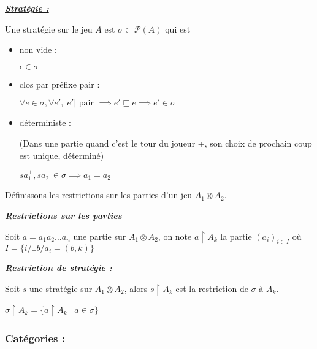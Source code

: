 \documentclass[a4paper,12ptCOUCOU
]{article}
\newlength{\mydepth}
\newlength{\myheight}
\newenvironment{answer}[1]
{\vspace{0.5cm}\begin{minipage}{\linewidth}\textbf{\textit{\underline{#1}}}\par\begin{lrbox}{\mybox}\quad\begin{minipage}{\linewidth}\color{black}\setlength{\parskip}{10pt}}
{\end{minipage}\end{lrbox}
\settodepth{\mydepth}{\usebox{\mybox}}
\settoheight{\myheight}{\usebox{\mybox}}
\addtolength{\myheight}{\mydepth}
\noindent\makebox[0pt]{
  \color{gray}\hspace{-0pt}\rule[-\mydepth]{1pt}{\myheight}}
\usebox{\mybox}
\end{minipage}
  }
\begin{document}
\begin{answer}{Stratégie :}
Une stratégie sur le jeu $A$ est $\sigma \subset \mathcal{P}(A)$ qui est
\begin{itemize}
\item non vide :

$\epsilon \in \sigma$

\item clos par préfixe pair :

$\forall e \in \sigma, \forall e', |e'| \text{ pair } \implies e' \sqsubseteq e \implies e' \in \sigma$

\item déterministe :

(Dans une partie quand c'est le tour du joueur +, son choix de prochain coup
est unique, déterminé)

$sa_1^+, sa_2^+ \in \sigma \implies a_1 = a_2$

\end{itemize}
\end{answer}

Définissons les restrictions sur les parties d'un jeu $A_1 \otimes A_2$.

\begin{answer}{Restrictions sur les parties}
Soit $a = a_1 a_2 \dots a_n$ une partie sur $A_1 \otimes A_2$,
on note $a \upharpoonright A_k$ la partie $(a_i)_{i \in I}$ où
$I = \{i / \exists b / a_i = (b,k)\}$


\end{answer}

\begin{answer}{Restriction de stratégie :}
Soit $s$ une stratégie sur $A_1 \otimes A_2$, alors $s\upharpoonright A_k$ est la
restriction de $\sigma$ à $A_k$.

$\sigma \upharpoonright A_k = \{a\upharpoonright A_k \mid a \in \sigma\}$

\end{answer}

\subsubsection{Catégories :}
\end{document}
